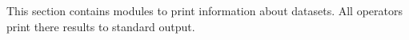 This section contains modules to print information about datasets.
All operators print there results to standard output.
